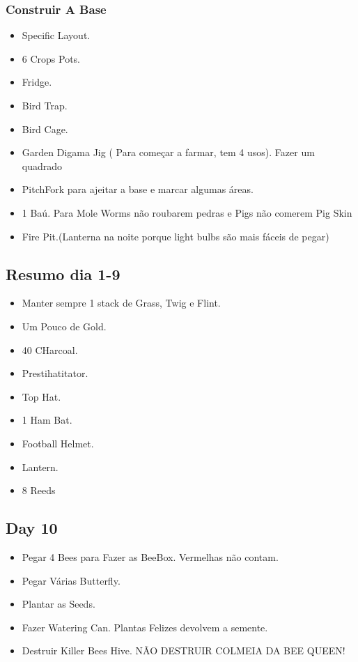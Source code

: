 \documentclass{article}
\begin{document}
\subsubsection{Construir A Base}
\begin{itemize}
    \item Specific Layout.
    \item 6 Crops Pots.
    \item Fridge.
    \item Bird Trap.
    \item Bird Cage.
    \item Garden Digama Jig ( Para começar a farmar, tem 4 usos). Fazer um quadrado
    \item PitchFork para ajeitar a base e marcar algumas áreas.
    \item 1 Baú. Para Mole Worms não roubarem pedras e Pigs não comerem Pig Skin
    \item Fire Pit.(Lanterna na noite porque light bulbs são mais fáceis de pegar)
\end{itemize}

\subsection*{Resumo dia 1-9}
\begin{itemize}
    \item Manter sempre 1 stack de Grass, Twig e Flint.
    \item Um Pouco de Gold.
    \item 40 CHarcoal.
    \item Prestihatitator.
    \item Top Hat.
    \item 1 Ham Bat.
    \item Football Helmet.
    \item Lantern.
    \item 8 Reeds
    
\end{itemize}

\subsection{Day 10}
\begin{itemize}
    \item Pegar 4 Bees para Fazer as BeeBox. Vermelhas não contam.
    \item Pegar Várias Butterfly.
    \item Plantar as Seeds.
    \item Fazer Watering Can. Plantas Felizes devolvem a semente.
    \item Destruir Killer Bees Hive. NÃO DESTRUIR COLMEIA DA BEE QUEEN!
\end{itemize}
\end{document}
